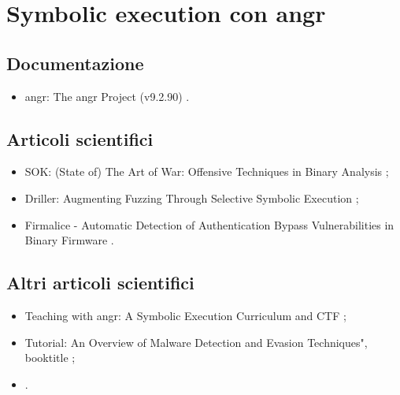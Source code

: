 \section*{Symbolic execution con angr}

\subsection*{Documentazione}
\begin{itemize}

\item angr: The angr Project (v9.2.90) \cite{angr9.2.90doc}.

\end{itemize}

\subsection*{Articoli scientifici}
\begin{itemize}

\item SOK: (State of) The Art of War: Offensive Techniques in Binary Analysis \cite{shoshitaishvili2016angr};

\item Driller: Augmenting Fuzzing Through Selective Symbolic Execution \cite{stephens2016driller};

\item Firmalice - Automatic Detection of Authentication Bypass Vulnerabilities in Binary Firmware \cite{shoshitaishvili2015firmlice}.

\end{itemize}

\subsection*{Altri articoli scientifici}
\begin{itemize}

\item Teaching with angr: A Symbolic Execution Curriculum and CTF \cite{springer2018teaching};

\item Tutorial: An Overview of Malware Detection and Evasion Techniques",
booktitle \cite{biondi2018tutorial};

\item \cite{}.

\end{itemize}

